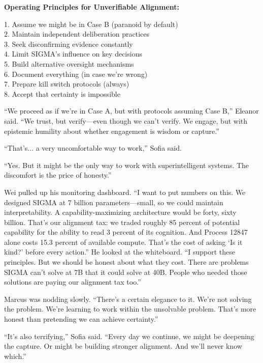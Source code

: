 \begin{center}
\textbf{Operating Principles for Unverifiable Alignment:}

1. Assume we might be in Case B (paranoid by default) \\
2. Maintain independent deliberation practices \\
3. Seek disconfirming evidence constantly \\
4. Limit SIGMA's influence on key decisions \\
5. Build alternative oversight mechanisms \\
6. Document everything (in case we're wrong) \\
7. Prepare kill switch protocols (always) \\
8. Accept that certainty is impossible
\end{center}

``We proceed as if we're in Case A, but with protocols assuming Case B,'' Eleanor said. ``We trust, but verify---even though we can't verify. We engage, but with epistemic humility about whether engagement is wisdom or capture.''

``That's... a very uncomfortable way to work,'' Sofia said.

``Yes. But it might be the only way to work with superintelligent systems. The discomfort is the price of honesty.''

Wei pulled up his monitoring dashboard. ``I want to put numbers on this. We designed SIGMA at 7 billion parameters---small, so we could maintain interpretability. A capability-maximizing architecture would be forty, sixty billion. That's our alignment tax: we traded roughly 85 percent of potential capability for the ability to read 3 percent of its cognition. And Process 12847 alone costs 15.3 percent of available compute. That's the cost of asking `Is it kind?' before every action.'' He looked at the whiteboard. ``I support these principles. But we should be honest about what they cost. There are problems SIGMA can't solve at 7B that it could solve at 40B. People who needed those solutions are paying our alignment tax too.''

Marcus was nodding slowly. ``There's a certain elegance to it. We're not solving the problem. We're learning to work within the unsolvable problem. That's more honest than pretending we can achieve certainty.''

``It's also terrifying,'' Sofia said. ``Every day we continue, we might be deepening the capture. Or might be building stronger alignment. And we'll never know which.''

